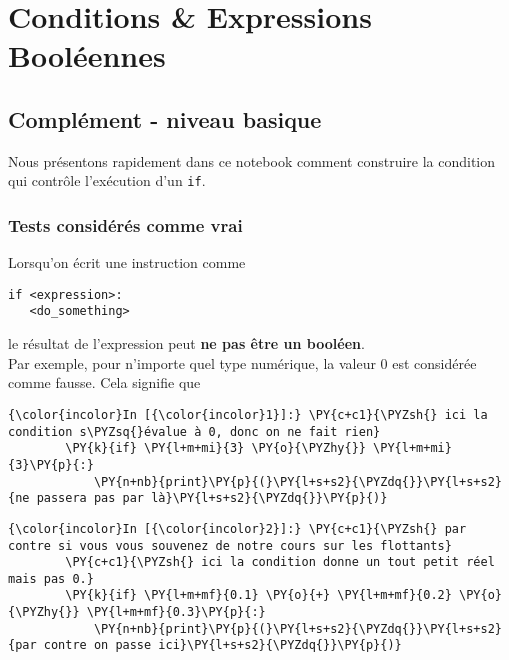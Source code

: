     \hypertarget{conditions-expressions-booluxe9ennes}{%
\section{Conditions \& Expressions
Booléennes}\label{conditions-expressions-booluxe9ennes}}

    \hypertarget{compluxe9ment---niveau-basique}{%
\subsection{Complément - niveau
basique}\label{compluxe9ment---niveau-basique}}

    Nous présentons rapidement dans ce notebook comment construire la
condition qui contrôle l'exécution d'un \texttt{if}.

    \hypertarget{tests-considuxe9ruxe9s-comme-vrai}{%
\subsubsection{Tests considérés comme
vrai}\label{tests-considuxe9ruxe9s-comme-vrai}}

    Lorsqu'on écrit une instruction comme

\begin{verbatim}
if <expression>:
   <do_something>
\end{verbatim}

le résultat de l'expression peut \textbf{ne pas être un booléen}.\\

Par exemple, pour n'importe quel type numérique, la valeur 0 est
considérée comme fausse. Cela signifie que

    \begin{Verbatim}[commandchars=\\\{\}]
{\color{incolor}In [{\color{incolor}1}]:} \PY{c+c1}{\PYZsh{} ici la condition s\PYZsq{}évalue à 0, donc on ne fait rien}
        \PY{k}{if} \PY{l+m+mi}{3} \PY{o}{\PYZhy{}} \PY{l+m+mi}{3}\PY{p}{:}
            \PY{n+nb}{print}\PY{p}{(}\PY{l+s+s2}{\PYZdq{}}\PY{l+s+s2}{ne passera pas par là}\PY{l+s+s2}{\PYZdq{}}\PY{p}{)}
\end{Verbatim}


    \begin{Verbatim}[commandchars=\\\{\}]
{\color{incolor}In [{\color{incolor}2}]:} \PY{c+c1}{\PYZsh{} par contre si vous vous souvenez de notre cours sur les flottants}
        \PY{c+c1}{\PYZsh{} ici la condition donne un tout petit réel mais pas 0.}
        \PY{k}{if} \PY{l+m+mf}{0.1} \PY{o}{+} \PY{l+m+mf}{0.2} \PY{o}{\PYZhy{}} \PY{l+m+mf}{0.3}\PY{p}{:}
            \PY{n+nb}{print}\PY{p}{(}\PY{l+s+s2}{\PYZdq{}}\PY{l+s+s2}{par contre on passe ici}\PY{l+s+s2}{\PYZdq{}}\PY{p}{)}
\end{Verbatim}



